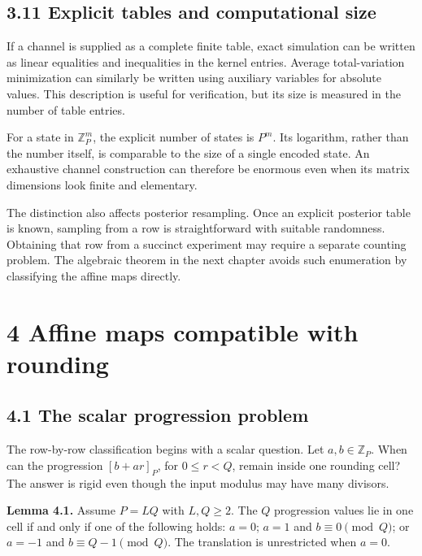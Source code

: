 \documentclass[
]{article}
\begin{document}
\subsection{3.11 Explicit tables and computational
size}\label{explicit-tables-and-computational-size}

If a channel is supplied as a complete finite table, exact simulation
can be written as linear equalities and inequalities in the kernel
entries. Average total-variation minimization can similarly be written
using auxiliary variables for absolute values. This description is
useful for verification, but its size is measured in the number of table
entries.

For a state in \(\mathbb Z_P^m\), the explicit number of states is
\(P^m\). Its logarithm, rather than the number itself, is comparable to
the size of a single encoded state. An exhaustive channel construction
can therefore be enormous even when its matrix dimensions look finite
and elementary.

The distinction also affects posterior resampling. Once an explicit
posterior table is known, sampling from a row is straightforward with
suitable randomness. Obtaining that row from a succinct experiment may
require a separate counting problem. The algebraic theorem in the next
chapter avoids such enumeration by classifying the affine maps directly.

\section{4 Affine maps compatible with
rounding}\label{affine-maps-compatible-with-rounding}

\subsection{4.1 The scalar progression
problem}\label{the-scalar-progression-problem}

The row-by-row classification begins with a scalar question. Let
\(a,b\in\mathbb Z_P\). When can the progression \([b+ar]_P\), for
\(0\le r<Q\), remain inside one rounding cell? The answer is rigid even
though the input modulus may have many divisors.

\textbf{Lemma 4.1.} Assume \(P=LQ\) with \(L,Q\ge2\). The \(Q\)
progression values lie in one cell if and only if one of the following
holds: \(a=0\); \(a=1\) and \(b\equiv0\pmod Q\); or \(a=-1\) and
\(b\equiv Q-1\pmod Q\). The translation is unrestricted when \(a=0\).
\end{document}

